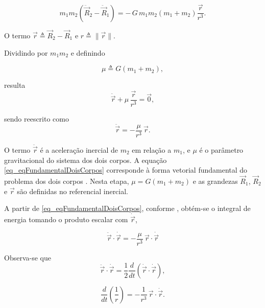 \begin{equation}
m_1 m_2\left(\ddot{\vec R}_2-\ddot{\vec R}_1\right)
=
-\,G\,m_1 m_2\left(m_1+m_2\right)\frac{\vec r}{r^3}.
\end{equation}

O termo $\vec r\triangleq \vec R_2-\vec R_1$ e $r\triangleq\|\vec r\|$.

Dividindo por $m_1 m_2$ e definindo

\begin{equation}
\mu \triangleq G(m_1+m_2),
\end{equation}

resulta
\begin{equation}
\label{eq_eqFundamentalDoisCorpos1}
\ddot{\vec{r}} + \mu\,\frac{\vec{r}}{r^3} = \vec 0,
\end{equation}

sendo reescrito como
\begin{equation}
\label{eq_eqFundamentalDoisCorpos}
\ddot{\vec r} = -\frac{\mu}{r^3}\,\vec r.
\end{equation}

O termo $\ddot{\vec r}$ é a aceleração inercial de $m_2$ em relação a $m_1$, e $\mu$ é o parâmetro gravitacional do sistema dos dois corpos.
A equação \eqref{eq_eqFundamentalDoisCorpos} corresponde à forma vetorial fundamental do problema dos dois corpos \cite{wie2008space}.
Nesta etapa, $\mu=G(m_1+m_2)$ e as grandezas $\vec R_1$, $\vec R_2$ e $\vec r$ são definidas no referencial inercial.

A partir de \eqref{eq_eqFundamentalDoisCorpos}, conforme \cite{wie2008space}, obtém-se o integral de energia tomando o produto escalar com $\dot{\vec r}$,

\begin{equation}
\ddot{\vec r}\cdot \dot{\vec r}
=
-\frac{\mu}{r^3}\,\vec r\cdot \dot{\vec r}
\label{eq_energia_dot_1}
\end{equation}

Observa-se que
\begin{equation}
\ddot{\vec r}\cdot \dot{\vec r}
=
\frac{1}{2}\frac{d}{dt}\!\left(\dot{\vec r}\cdot \dot{\vec r}\right),
\label{eq_identidade_ddotr_dotr}
\end{equation}

\begin{equation}
\frac{d}{dt}\!\left(\frac{1}{r}\right)
=
-\frac{1}{r^3}\,\vec r\cdot \dot{\vec r}.
\label{eq_identidade_d1sobrer}
\end{equation}

